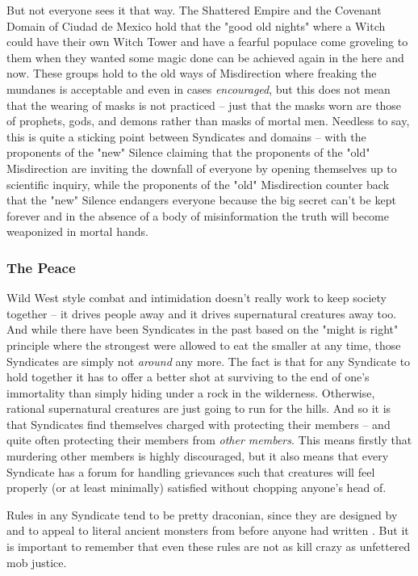 But not everyone sees it that way. The Shattered Empire and the Covenant Domain of Ciudad de Mexico hold that the "good old nights" where a Witch could have their own Witch Tower and have a fearful populace come groveling to them when they wanted some magic done can be achieved again in the here and now. These groups hold to the old ways of Misdirection where freaking the mundanes is acceptable and even in cases \textit{encouraged}, but this does not mean that the wearing of masks is not practiced -- just that the masks worn are those of prophets, gods, and demons rather than masks of mortal men. Needless to say, this is quite a sticking point between Syndicates and domains -- with the proponents of the "new" Silence claiming that the proponents of the "old" Misdirection are inviting the downfall of everyone by opening themselves up to scientific inquiry, while the proponents of the "old" Misdirection counter back that the "new" Silence endangers everyone because the big secret can't be kept forever and in the absence of a body of misinformation the truth will become weaponized in mortal hands.

\subsubsection{The Peace}
\hspace{\parindent} Wild West style combat and intimidation doesn't really work to keep society together -- it drives people away and it drives supernatural creatures away too. And while there have been Syndicates in the past based on the "might is right" principle where the strongest were allowed to eat the smaller at any time, those Syndicates are simply not \textit{around} any more. The fact is that for any Syndicate to hold together it has to offer a better shot at surviving to the end of one's immortality than simply hiding under a rock in the wilderness. Otherwise, rational supernatural creatures are just going to run for the hills. And so it is that Syndicates find themselves charged with protecting their members -- and quite often protecting their members from \textit{other members}. This means firstly that murdering other members is highly discouraged, but it also means that every Syndicate has a forum for handling grievances such that creatures will feel properly (or at least minimally) satisfied without chopping anyone's head of.

Rules in any Syndicate tend to be pretty draconian, since they are designed by and to appeal to literal ancient monsters from before anyone had written . But it is important to remember that even these rules are not as kill crazy as unfettered mob justice.


